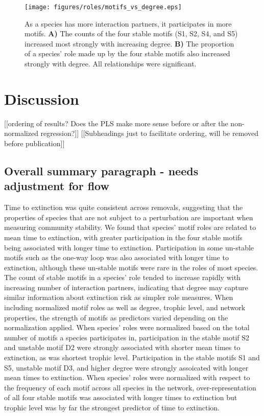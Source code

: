 \documentclass[12pt]{article}
\begin{document}
		\begin{figure}[h!]
			\caption{As a species has more interaction partners, it participates in more motifs. \textbf{A)} The counts of the four stable motifs (S1, S2, S4, and S5) increased most strongly with increasing degree. \textbf{B)} The proportion of a species' role made up by the four stable motifs also increased strongly with degree. All relationships were significant.}
			\label{motif_vs_degree}
			\texttt{[image: figures/roles/motifs\_vs\_degree.eps]}
			\end{figure}



\section{Discussion}

	[[ordering of results? Does the PLS make more sense before or after the non-normalized regression?]]
	[[Subheadings just to facilitate ordering, will be removed before publication]]


	\subsection*{Overall summary paragraph - needs adjustment for flow}

		Time to extinction was quite consistent across removals, suggesting that the properties of species that are not subject to a perturbation are important when measuring community stability.
		We found that species' motif roles are related to mean time to extinction, with greater participation in the four stable motifs being associated with longer time to extinction.
		Participation in some un-stable motifs such as the one-way loop was also associated with longer time to extinction, although these un-stable motifs were rare in the roles of most species.
		The count of stable motifs in a species' role tended to increase rapidly with increasing number of interaction partners, indicating that degree may capture similar information about extinction risk as simpler role measures.
		When including normalized motif roles as well as degree, trophic level, and network properties, the strength of motifs as predictors varied depending on the normalization applied.
		When species' roles were normalized based on the total number of motifs a species participates in, participation in the stable motif S2 and unstable motif D2 were strongly associated with shorter mean times to extinction, as was shortest trophic level.
		Participation in the stable motifs S1 and S5, unstable motif D3, and higher degree were strongly assoicated with longer mean times to extinction.
		When species' roles were normalized with respect to the frequency of each motif across all species in the network, over-representation of all four stable motifs was associated with longer times to extinction but trophic level was by far the strongest predictor of time to extinction.
\end{document}
